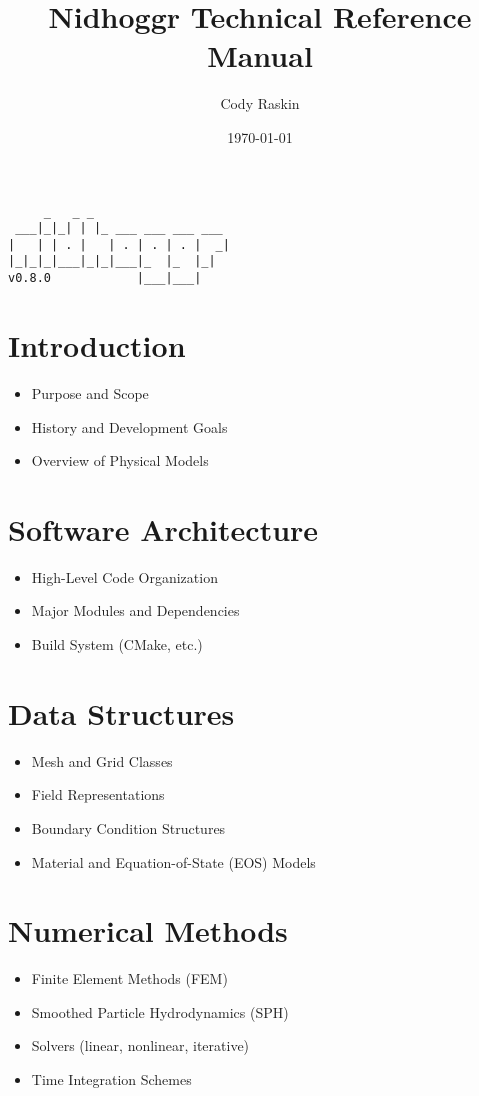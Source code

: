 \documentclass[12pt]{article}
\title{Nidhoggr Technical Reference Manual}
\author{Cody Raskin}
\date{\today}
\begin{document}
	
	\maketitle
	
	\newpage
	
	\begin{center}
		\begin{verbatim}
     _   _ _
 ___|_|_| | |_ ___ ___ ___ ___
|   | | . |   | . | . | . |  _|
|_|_|_|___|_|_|___|_  |_  |_|
v0.8.0            |___|___|
		\end{verbatim}
	\end{center}
	
	\newpage
	
	\tableofcontents
	\newpage
	
	\section{Introduction}
	\begin{itemize}
		\item Purpose and Scope
		\item History and Development Goals
		\item Overview of Physical Models
	\end{itemize}
	
	\section{Software Architecture}
	\begin{itemize}
		\item High-Level Code Organization
		\item Major Modules and Dependencies
		\item Build System (CMake, etc.)
	\end{itemize}
	
	\section{Data Structures}
	\begin{itemize}
		\item Mesh and Grid Classes
		\item Field Representations
		\item Boundary Condition Structures
		\item Material and Equation-of-State (EOS) Models
	\end{itemize}
	
	\section{Numerical Methods}
	\begin{itemize}
		\item Finite Element Methods (FEM)
		\item Smoothed Particle Hydrodynamics (SPH)
		\item Solvers (linear, nonlinear, iterative)
		\item Time Integration Schemes
	\end{itemize}
	
\end{document}
